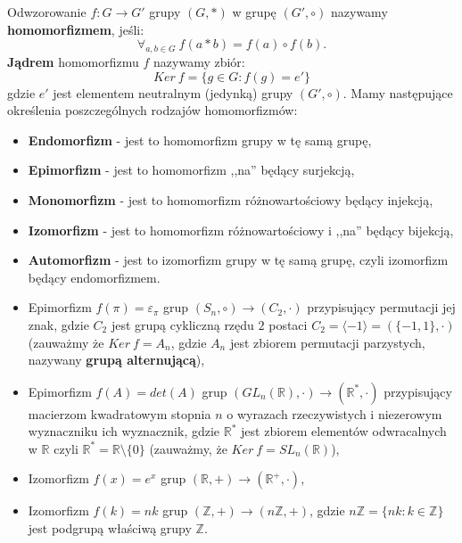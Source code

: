 \begin{df}
Odwzorowanie $f:G\rightarrow G'$ grupy $(G,\ast)$ w grupę $(G',\circ)$ nazywamy \textbf{homomorfizmem}, jeśli: $$\forall_{a,b\in G}\ f(a\ast b)=f(a)\circ f(b).$$
\textbf{Jądrem} homomorfizmu $f$ nazywamy zbiór: $$Ker\ f=\{g\in G:f(g)=e'\}$$ gdzie $e'$ jest elementem neutralnym (jedynką) grupy $(G',\circ)$. Mamy następujące określenia poszczególnych rodzajów homomorfizmów:
\begin{itemize}
\item
\textbf{Endomorfizm} - jest to homomorfizm grupy w tę samą grupę,
\item
\textbf{Epimorfizm} - jest to homomorfizm ,,na'' będący surjekcją,
\item
\textbf{Monomorfizm} - jest to homomorfizm różnowartościowy będący injekcją,
\item
\textbf{Izomorfizm} - jest to homomorfizm różnowartościowy i ,,na'' będący bijekcją,
\item
\textbf{Automorfizm} - jest to izomorfizm grupy w tę samą grupę, czyli izomorfizm będący endomorfizmem.
\end{itemize}
\end{df}

\begin{przyk}
\begin{itemize}
\item
Epimorfizm $f(\pi)=\varepsilon_\pi$ grup $(S_n,\circ)\rightarrow (C_2,\cdot)$ przypisujący permutacji jej znak, gdzie $C_2$ jest grupą cykliczną rzędu $2$ postaci $C_2=\langle -1\rangle=(\{-1,1\},\cdot)$ (zauważmy że $Ker\ f=A_n$, gdzie $A_n$ jest zbiorem permutacji parzystych, nazywany \textbf{grupą alternującą}),
\item
Epimorfizm $f(A)=det(A)$ grup $(GL_n(\mathbb{R}),\cdot)\rightarrow(\mathbb{R}^{\ast},\cdot)$ przypisujący macierzom kwadratowym stopnia $n$ o wyrazach rzeczywistych i niezerowym wyznaczniku ich wyznacznik, gdzie $\mathbb{R}^{\ast}$ jest zbiorem elementów odwracalnych w $\mathbb{R}$ czyli $\mathbb{R}^{\ast}=\mathbb{R}\setminus\{0\}$ (zauważmy, że $Ker\ f=SL_n(\mathbb{R})$),
\item
Izomorfizm $f(x)=e^x$ grup $(\mathbb{R},+)\rightarrow(\mathbb{R}^{+},\cdot)$,
\item
Izomorfizm $f(k)=nk$ grup $(\mathbb{Z},+)\rightarrow(n\mathbb{Z},+)$, gdzie $n\mathbb{Z}=\{nk:k\in\mathbb{Z}\}$ jest podgrupą właściwą grupy $\mathbb{Z}$.
\end{itemize}
\end{przyk}

